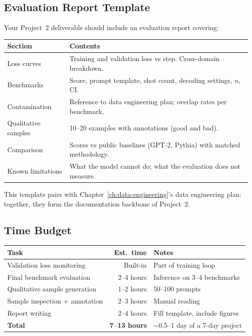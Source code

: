 \subsection{Evaluation Report Template}

Your Project~2 deliverable should include an evaluation report covering:

\begin{center}
\begin{tabularx}{\textwidth}{@{}lX@{}}
\toprule
\textbf{Section} & \textbf{Contents} \\
\midrule
Loss curves & Training and validation loss vs step. Cross-domain breakdown. \\
Benchmarks & Score, prompt template, shot count, decoding settings, $n$, CI. \\
Contamination & Reference to data engineering plan; overlap rates per benchmark. \\
Qualitative samples & 10--20 examples with annotations (good and bad). \\
Comparison & Scores vs public baselines (GPT-2, Pythia) with matched methodology. \\
Known limitations & What the model cannot do; what the evaluation does not measure. \\
\bottomrule
\end{tabularx}
\end{center}

This template pairs with Chapter~\ref{ch:data-engineering}'s data engineering plan: together, they form the documentation backbone of Project~2.

\subsection{Time Budget}

\begin{center}
\begin{tabularx}{\textwidth}{@{}lrX@{}}
\toprule
\textbf{Task} & \textbf{Est.\ time} & \textbf{Notes} \\
\midrule
Validation loss monitoring & Built-in & Part of training loop \\
Final benchmark evaluation & 2--4 hours & Inference on 3--4 benchmarks \\
Qualitative sample generation & 1--2 hours & 50--100 prompts \\
Sample inspection + annotation & 2--3 hours & Manual reading \\
Report writing & 2--4 hours & Fill template, include figures \\
\midrule
\textbf{Total} & \textbf{7--13 hours} & $\sim$0.5--1 day of a 7-day project \\
\bottomrule
\end{tabularx}
\end{center}

